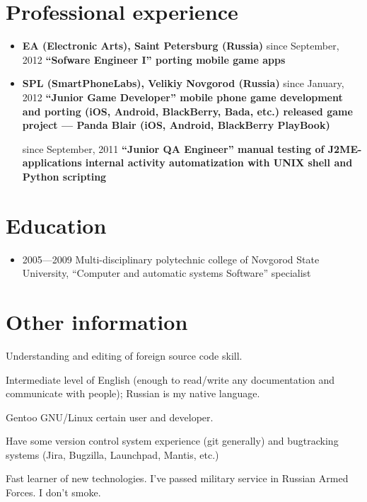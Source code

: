 \section{Professional experience}
\begin{itemize}
\item {
\fontsize{14pt}{14pt}\selectfont
\bfseries EA (Electronic Arts)\mdseries, Saint Petersburg (Russia)
}
\subitem since September, 2012 \bfseries ``Sofware Engineer I''\mdseries
\subsubitem porting mobile game apps

\item {
\fontsize{14pt}{14pt}\selectfont
\bfseries SPL (SmartPhoneLabs)\mdseries, Velikiy Novgorod (Russia)
}
\subitem since January, 2012 \bfseries ``Junior Game Developer''\mdseries
\subsubitem mobile phone game development and porting
(iOS, Android, BlackBerry, Bada, etc.)
\subsubitem released game project --- Panda Blair (iOS, Android, BlackBerry PlayBook)

\subitem since September, 2011 \bfseries ``Junior QA Engineer''\mdseries
\subsubitem manual testing of J2ME-applications
\subsubitem internal activity automatization with UNIX shell and Python scripting
\end{itemize}

\section{Education}
\begin{itemize}
\item 2005---2009 Multi-disciplinary polytechnic college of
Novgorod State University,
``Computer and automatic systems Software'' specialist
\end{itemize}

\section{Other information}
Understanding and editing of foreign source code skill.

Intermediate level of English
(enough to read/write any documentation and communicate with people);
Russian is my native language.

Gentoo GNU/Linux certain user and developer.

Have some version control system experience (git generally) and
bugtracking systems (Jira, Bugzilla, Launchpad, Mantis, etc.)

Fast learner of new technologies.
I've passed military service in Russian Armed Forces.
I don't smoke.
